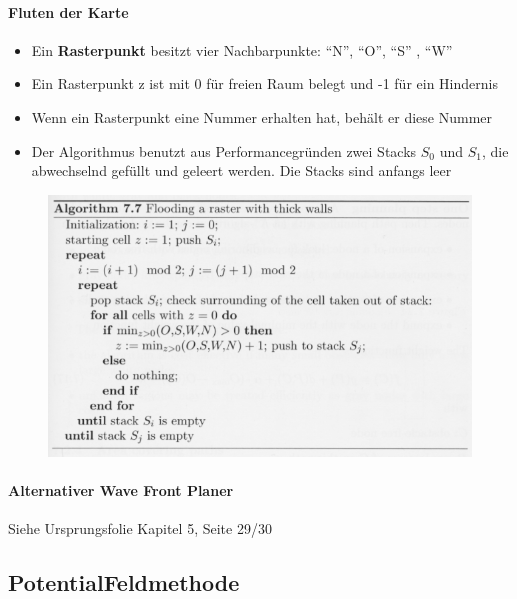\paragraph{Fluten der Karte}
\begin{itemize}
	\item Ein \textbf{Rasterpunkt} besitzt vier Nachbarpunkte: \enquote{N}, \enquote{O}, \enquote{S} , \enquote{W}
	\item Ein Rasterpunkt z ist mit 0 für freien Raum belegt und -1 für ein Hindernis
	\item Wenn ein Rasterpunkt eine Nummer erhalten hat, behält er diese Nummer
	\item Der Algorithmus benutzt aus Performancegründen zwei Stacks $S_0$ und $S_1$, die abwechselnd gefüllt und geleert werden. Die Stacks sind anfangs leer
\end{itemize}
\begin{figure}[H]
	\begin{center}
		\includegraphics[]{Resources/PNG/Flooding.PNG}
		\caption{}
		\label{fig:PNG/Flooding.PNG}
	\end{center}
\end{figure}
\paragraph{Alternativer Wave Front Planer}
Siehe Ursprungsfolie Kapitel 5, Seite 29/30
\subsection{PotentialFeldmethode}
